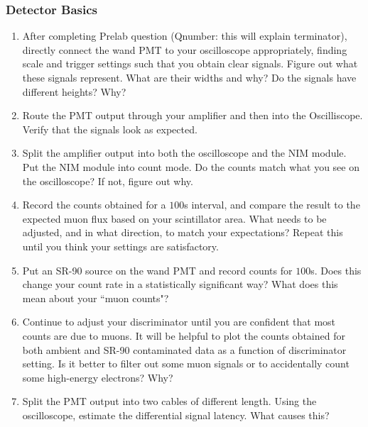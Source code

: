 \documentclass[aps,prb,groupedaddress,notitlepage,nofootinbib]{revtex4-1} %
\begin{document}
\subsubsection{Detector Basics}
\begin{enumerate}
\item After completing Prelab question (Qnumber: this will explain terminator), directly connect the wand PMT to your oscilloscope appropriately, finding scale and trigger settings such that you obtain clear signals. Figure out what these signals represent. What are their widths and why? Do the signals have different heights? Why?
\item Route the PMT output through your amplifier and then into the Oscilliscope. Verify that the signals look as expected.
\item Split the amplifier output into both the oscilloscope and the NIM module. Put the NIM module into count mode. Do the counts match what you see on the oscilloscope? If not, figure out why.
\item Record the counts obtained for a $100$s interval, and compare the result to the expected muon flux based on your scintillator area. What needs to be adjusted, and in what direction, to match your expectations? Repeat this until you think your settings are satisfactory.
\item Put an SR-90 source on the wand PMT and record counts for $100$s. Does this change your count rate in a statistically significant way? What does this mean about your ``muon counts"?
\item Continue to adjust your discriminator until you are confident that most counts are due to muons. It will be helpful to plot the counts obtained for both ambient and SR-90 contaminated data as a function of discriminator setting. Is it better to filter out some muon signals or to accidentally count some high-energy electrons? Why?
\item Split the PMT output into two cables of different length. Using the oscilloscope, estimate the differential signal latency. What causes this?
\end{enumerate}
\end{document}
